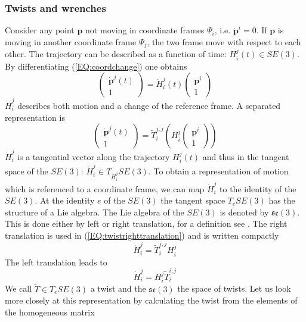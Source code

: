 \documentclass[a4paper,twoside, openright,12pt]{report}
\newcommand{\f}[1]{\boldsymbol{#1}}
\begin{document}
\subsubsection{Twists and wrenches}
Consider any point $ \f{p} $ not moving in coordinate frames $\Psi_i $, i.e. $ \dot{\f{p}}^i = 0 $. If $ \f{p} $ is moving in another coordinate frame $ \Psi_j $, the two frame move with respect to each other. The trajectory can be described as a function of time: $H_i^j(t) \in SE(3)$. By differentiating (\ref{EQ:coordchange}) one obtains
\[\begin{pmatrix}\dot{\f{p}}^j(t) \\ 1\end{pmatrix} = \dot{H}_i^j(t) \begin{pmatrix}\f{p}^i \\ 1\end{pmatrix} \]
$ \dot{H}_i^j $ describes both motion and a change of the reference frame. A separated representation is
\begin{equation}\label{EQ:twistrighttranslation}
	\begin{pmatrix}\dot{\f{p}}^j(t) \\ 1\end{pmatrix} = \tilde{T}_i^{j,j}\left(H_i^{j}\begin{pmatrix}\f{p}^i \\ 1\end{pmatrix}\right)
\end{equation}
$ \dot{H}_i^j$ is a tangential vector along the trajectory $H_i^j(t)$ and thus in the tangent space of the $SE(3)$: $ \dot{H}_i^j \in T_{H_i^j}SE(3)$. To obtain a representation of motion which is referenced to a coordinate frame, we can map $\dot{H}_i^j$ to the identity of the $SE(3)$. At the identity $ e $ of the $SE(3)$ the tangent space $ T_e SE(3) $ has the structure of a Lie algebra. The Lie algebra of the $SE(3)$ is denoted by $\mathfrak{se}(3)$. This is done either by left or right translation, for a definition see \cite{Stramigioli_01}. The right translation is used in (\ref{EQ:twistrighttranslation}) and is written compactly
\begin{equation}\label{EQ:righttranslation}
\dot{H}_i^j = \tilde{T}_i^{j,j} H_i^j
\end{equation}\label{EQ:lefttranslation}
The left translation leads to
\begin{equation}
\dot{H}_i^j = H_i^j \tilde{T}_i^{i,j} 
\end{equation}
We call $\tilde{T} \in T_e SE(3)$ a twist and the $\mathfrak{se}(3)$ the space of twists.
Let us look more closely at this representation by calculating the twist from the elements of the homogeneous matrix
\end{document}
